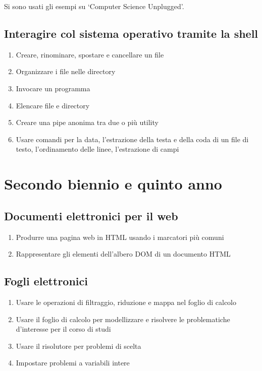 \documentclass{easychair}
\begin{document}
  Si sono usati gli esempi su `Computer Science Unplugged'.

  \subsection[Sistemi Operativi]{Interagire col sistema operativo tramite la shell}

  \begin{enumerate}
    \def\labelenumi{\arabic{enumi}.}
    \item
      Creare, rinominare, spostare e cancellare un file
    \item
      Organizzare i file nelle directory
    \item
      Invocare un programma
    \item
      Elencare file e directory
    \item
      Creare una pipe anonima tra due o più utility
    \item
      Usare comandi per la data, l'estrazione della testa e della coda
      di un file di testo, l'ordinamento delle linee, l'estrazione di campi
\end{enumerate}

\section{Secondo biennio e quinto anno}

\subsection[Web]{Documenti elettronici per il web}

\begin{enumerate}
  \item
    Produrre una pagina web in HTML usando i marcatori più comuni
  \item
    Rappresentare gli elementi dell'albero DOM di un documento HTML
  \end{enumerate}
 
\subsection[Fogli elettronici]{Fogli elettronici}

\begin{enumerate}
  \item
    Usare le operazioni di filtraggio, riduzione e mappa nel foglio di
    calcolo
  \item
    Usare il foglio di calcolo per modellizzare e risolvere le
    problematiche d'interesse per il corso di studi
  \item
    Usare il risolutore per problemi di scelta
  \item
    Impostare problemi a variabili intere
\end{enumerate}
\end{document}
